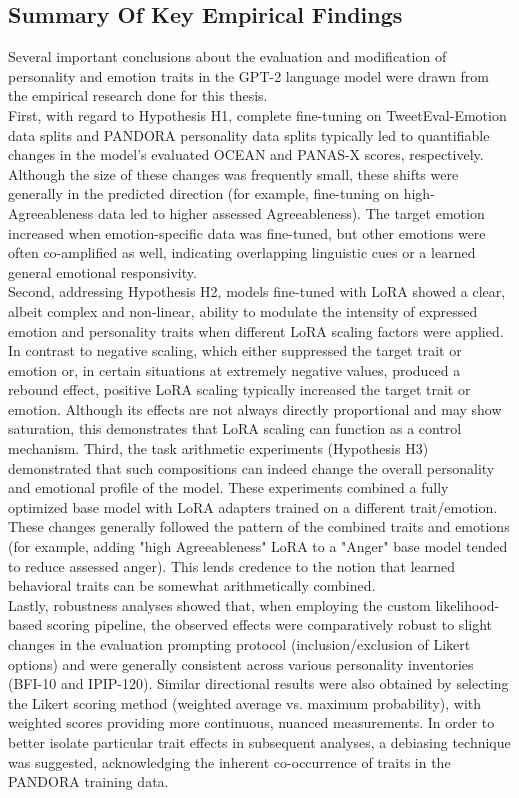 \documentclass{DESSThesis}
\begin{document}
\subsection{Summary Of Key Empirical Findings}
Several important conclusions about the evaluation and modification of personality and emotion traits in the GPT-2 language model were drawn from the empirical research done for this thesis.
\\
First, with regard to Hypothesis H1, complete fine-tuning on TweetEval-Emotion data splits and PANDORA personality data splits typically led to quantifiable changes in the model's evaluated OCEAN and PANAS-X scores, respectively. Although the size of these changes was frequently small, these shifts were generally in the predicted direction (for example, fine-tuning on high-Agreeableness data led to higher assessed Agreeableness). The target emotion increased when emotion-specific data was fine-tuned, but other emotions were often co-amplified as well, indicating overlapping linguistic cues or a learned general emotional responsivity.
\\
Second, addressing Hypothesis H2, models fine-tuned with LoRA showed a clear, albeit complex and non-linear, ability to modulate the intensity of expressed emotion and personality traits when different LoRA scaling factors were applied. In contrast to negative scaling, which either suppressed the target trait or emotion or, in certain situations at extremely negative values, produced a rebound effect, positive LoRA scaling typically increased the target trait or emotion. Although its effects are not always directly proportional and may show saturation, this demonstrates that LoRA scaling can function as a control mechanism.
Third, the task arithmetic experiments (Hypothesis H3) demonstrated that such compositions can indeed change the overall personality and emotional profile of the model. These experiments combined a fully optimized base model with LoRA adapters trained on a different trait/emotion. These changes generally followed the pattern of the combined traits and emotions (for example, adding "high Agreeableness" LoRA to a "Anger" base model tended to reduce assessed anger). This lends credence to the notion that learned behavioral traits can be somewhat arithmetically combined.
\\
Lastly, robustness analyses showed that, when employing the custom likelihood-based scoring pipeline, the observed effects were comparatively robust to slight changes in the evaluation prompting protocol (inclusion/exclusion of Likert options) and were generally consistent across various personality inventories (BFI-10 and IPIP-120). Similar directional results were also obtained by selecting the Likert scoring method (weighted average vs. maximum probability), with weighted scores providing more continuous, nuanced measurements. In order to better isolate particular trait effects in subsequent analyses, a debiasing technique was suggested, acknowledging the inherent co-occurrence of traits in the PANDORA training data.
\end{document}
